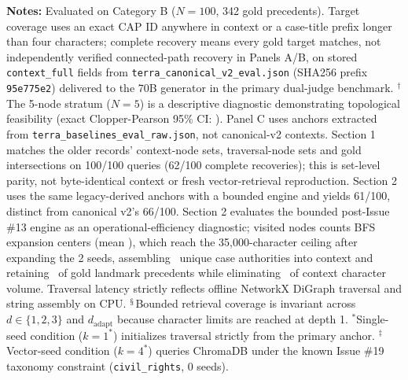 \raggedright \fontsize{8.5}{10.5}\selectfont \textbf{Notes:} Evaluated on Category B ($N=100$, 342 gold precedents). Target coverage uses an exact CAP ID anywhere in context or a case-title prefix longer than four characters; complete recovery means every gold target matches, not independently verified connected-path recovery in Panels A/B, on stored \texttt{context\_\allowbreak{}full} fields from \texttt{terra\_\allowbreak{}canonical\_\allowbreak{}v2\_\allowbreak{}eval.json} (SHA256 prefix \texttt{95e775e2}) delivered to the 70B generator in the primary dual-judge benchmark.
$^\dagger$The 5-node stratum ($N=5$) is a descriptive diagnostic demonstrating topological feasibility (exact Clopper-Pearson 95\% CI: \CatBFiveNodeClopperPearsonCI).
Panel C uses anchors extracted from \texttt{terra\_\allowbreak{}baselines\_\allowbreak{}eval\_\allowbreak{}raw.json}, not canonical-v2 contexts. Section 1 matches the older records' context-node sets, traversal-node sets and gold intersections on 100/100 queries (62/100 complete recoveries); this is set-level parity, not byte-identical context or fresh vector-retrieval reproduction. Section 2 uses the same legacy-derived anchors with a bounded engine and yields 61/100, distinct from canonical v2's 66/100. Section 2 evaluates the bounded post-Issue \#13 engine as an operational-efficiency diagnostic; visited nodes counts BFS expansion centers (mean \IssueTwentySixBoundMeanVisitedNodes), which reach the 35,000-character ceiling after expanding the 2 seeds, assembling \IssueTwentySixBoundMeanFullNodes\ unique case authorities into context and retaining \IssueTwentySixGoldRetentionPct\ of gold landmark precedents while eliminating \IssueTwentySixContextReductionPct\ of context character volume. Traversal latency strictly reflects offline NetworkX DiGraph traversal and string assembly on CPU. $^\mathsection$Bounded retrieval coverage is invariant across $d \in \{1,2,3\}$ and $d_{\text{adapt}}$ because character limits are reached at depth 1. $^\ast$Single-seed condition ($k=1^\ast$) initializes traversal strictly from the primary anchor. $^\ddagger$Vector-seed condition ($k=4^\ast$) queries ChromaDB under the known Issue \#19 taxonomy constraint (\texttt{civil\_\allowbreak{}rights}, 0 seeds).
\endgroup


